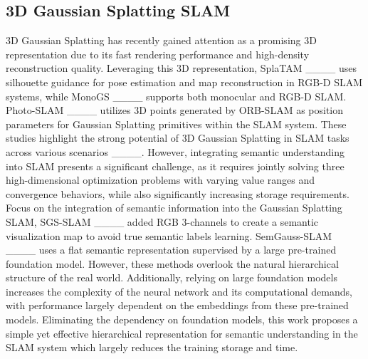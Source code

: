 \subsection{3D Gaussian Splatting SLAM}
    3D Gaussian Splatting has recently gained attention as a promising 3D representation due to its fast rendering performance and high-density reconstruction quality. 
    Leveraging this 3D representation, SplaTAM ____ uses silhouette guidance for pose estimation and map reconstruction in RGB-D SLAM systems, while MonoGS ____ supports both monocular and RGB-D SLAM. 
    Photo-SLAM ____ utilizes 3D points generated by ORB-SLAM as position parameters for Gaussian Splatting primitives within the SLAM system.
    These studies highlight the strong potential of 3D Gaussian Splatting in SLAM tasks across various scenarios ____. 
    However, integrating semantic understanding into SLAM presents a significant challenge, as it requires jointly solving three high-dimensional optimization problems with varying value ranges and convergence behaviors, while also significantly increasing storage requirements. 
    Focus on the integration of semantic information into the Gaussian Splatting SLAM, SGS-SLAM ____ added RGB 3-channels to create a semantic visualization map to avoid true semantic labels learning.
    SemGauss-SLAM ____ uses a flat semantic representation supervised by a large pre-trained foundation model. However, these methods overlook the natural hierarchical structure of the real world. Additionally, relying on large foundation models increases the complexity of the neural network and its computational demands, with performance largely dependent on the embeddings from these pre-trained models.
    Eliminating the dependency on foundation models, this work proposes a simple yet effective hierarchical representation for semantic understanding in the SLAM system which largely reduces the training storage and time. 



